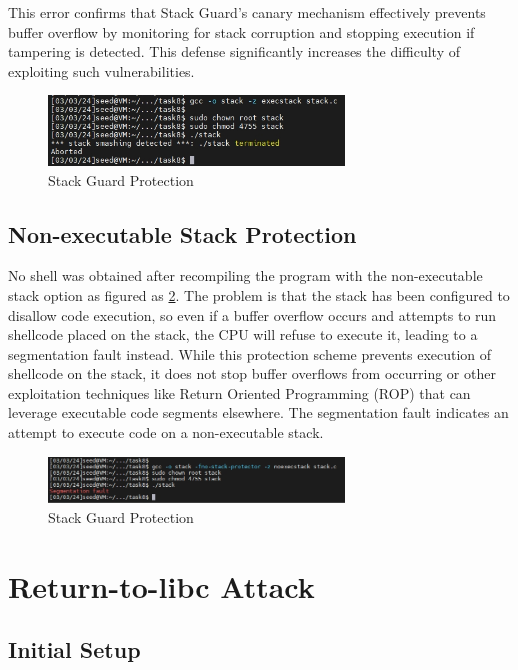 \documentclass[a4paper,11pt]{article}
\begin{document}
This error confirms that Stack Guard's canary mechanism effectively prevents buffer overflow by monitoring for stack corruption and stopping execution if tampering is detected. This defense significantly increases the difficulty of exploiting such vulnerabilities.

\begin{figure}[h]
    \centering
       \includegraphics[width=0.7\textwidth]{figures/task13/task13.png}
    \caption{Stack Guard Protection}\label{fig:task13}
\end{figure}

\subsection{Non-executable Stack Protection}
No shell was obtained after recompiling the program with the non-executable stack option as figured as \ref{fig:task14}. The problem is that the stack has been configured to disallow code execution, so even if a buffer overflow occurs and attempts to run shellcode placed on the stack, the CPU will refuse to execute it, leading to a segmentation fault instead. While this protection scheme prevents execution of shellcode on the stack, it does not stop buffer overflows from occurring or other exploitation techniques like Return Oriented Programming (ROP) that can leverage executable code segments elsewhere. The segmentation fault indicates an attempt to execute code on a non-executable stack.
\begin{figure}[h]
    \centering
       \includegraphics[width=0.7\textwidth]{figures/task14/task14.png}
    \caption{Stack Guard Protection}\label{fig:task14}
\end{figure}

\section{Return-to-libc Attack}
\subsection{Initial Setup}


%
\end{document}
